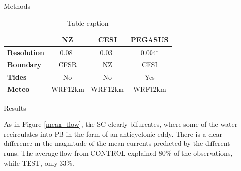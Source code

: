 \documentclass[final]{beamer}
\newlength{\onecolwid}
\newlength{\twocolwid}
\begin{document}
\begin{frame}[t]
\begin{columns}[t]
\begin{column}{\twocolwid}
\begin{columns}[t,totalwidth=\twocolwid]
\begin{column}{\onecolwid}
\begin{block}{Methods}
\begin{small}
            \begin{table}
            \vspace{2ex}
            \begin{tabular}{l c c c}
            \toprule
                                & \textbf{NZ}  & \textbf{CESI} & \textbf{PEGASUS} \\
            \midrule
            \textbf{Resolution} & 0.08$^\circ$ & 0.03$^\circ$ & 0.004$^\circ$ \\
            \textbf{Boundary}   & CFSR         & NZ           & CESI          \\
            \textbf{Tides}      & No           & No           & Yes           \\
            \textbf{Meteo}      & WRF12km      & WRF12km      & WRF12km        \\
            \bottomrule
            \end{tabular}
            \caption{\label{roms_configs} Table caption}
            \end{table}

            \end{small}


            \end{block}

            \begin{block}{Results}

            As in Figure \ref{mean_flow}, the SC clearly bifurcates, where some of the water recirculates into PB in the form of an anticyclonic eddy. There is a clear difference in the magnitude of the mean currents predicted by the different runs. The average flow from CONTROL explained 80\% of the observations, while TEST, only 33\%. 

            \end{block}


        \end{column} %

        \begin{column}{\onecolwid}\vspace{-.6in} %

            \begin{block}


\end{block}
\end{column}
\end{columns}
\end{column}
\end{columns}
\end{frame}
\end{document}
